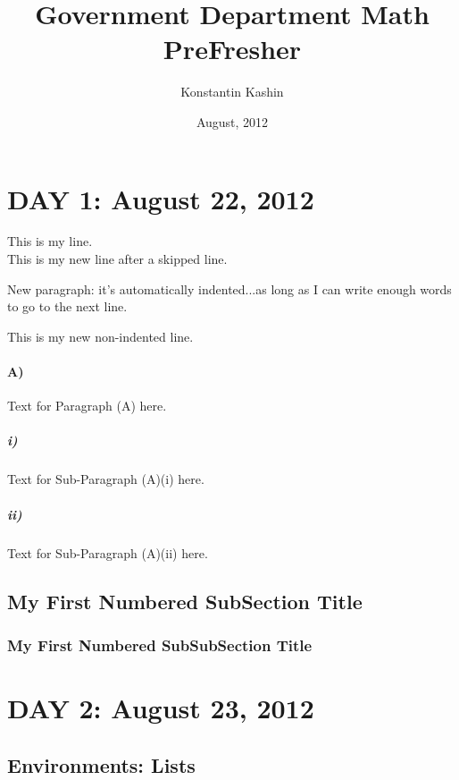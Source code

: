 \documentclass[10pt]{article}
\title{Government Department Math PreFresher}
\author{Konstantin Kashin}
\date{August, 2012}
\begin{document}

\maketitle

\section*{DAY 1: August 22, 2012}

This is my line. \\

This is my new line after a skipped line.

New paragraph: it's automatically indented...as long as I can write enough words to go to the next line.

\noindent This is my new non-indented line.

\paragraph{A)} Text for Paragraph (A) here.

\subparagraph{i)} Text for Sub-Paragraph (A)(i) here.

\subparagraph{ii)} Text for Sub-Paragraph (A)(ii) here.

\subsection{My First Numbered SubSection Title}

\subsubsection{My First Numbered SubSubSection Title}

\section*{DAY 2: August 23, 2012}

\subsection*{Environments: Lists}
\end{document}
